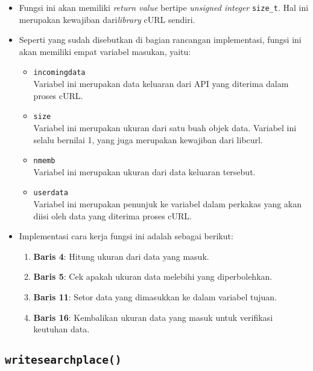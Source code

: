 \begin{itemize}
	\item Fungsi ini akan memiliki \textit{return value} bertipe \textit{unsigned integer} \verb|size_t|. Hal ini merupakan kewajiban dari\textit{library} cURL sendiri.
	\item Seperti yang sudah disebutkan di bagian rancangan implementasi, fungsi ini akan memiliki empat variabel masukan, yaitu:
	
	\begin{itemize}
		\item \verb|incomingdata| \\
		Variabel ini merupakan data keluaran dari API yang diterima dalam proses cURL.
		\item \verb|size| \\
		Variabel ini merupakan ukuran dari satu buah objek data. Variabel ini selalu bernilai 1, yang juga merupakan kewajiban dari libcurl.
		\item \verb|nmemb| \\
		Variabel ini merupakan ukuran dari data keluaran tersebut.
		\item \verb|userdata| \\
		Variabel ini merupakan penunjuk ke variabel dalam perkakas yang akan diisi oleh data yang diterima proses cURL.
	\end{itemize}
	
	\item Implementasi cara kerja fungsi ini adalah sebagai berikut:
	
	\begin{enumerate}
		\item \textbf{Baris 4}: Hitung ukuran dari data yang masuk.
		\item \textbf{Baris 5}: Cek apakah ukuran data melebihi yang diperbolehkan.
		\item \textbf{Baris 11}: Setor data yang dimasukkan ke dalam variabel tujuan.
		\item \textbf{Baris 16}: Kembalikan ukuran data yang masuk untuk verifikasi keutuhan data.
	\end{enumerate}
\end{itemize}

\subsection{\texttt{write\textunderscore searchplace()}}
\label{sec:testing-implementation-write-searchplace}

